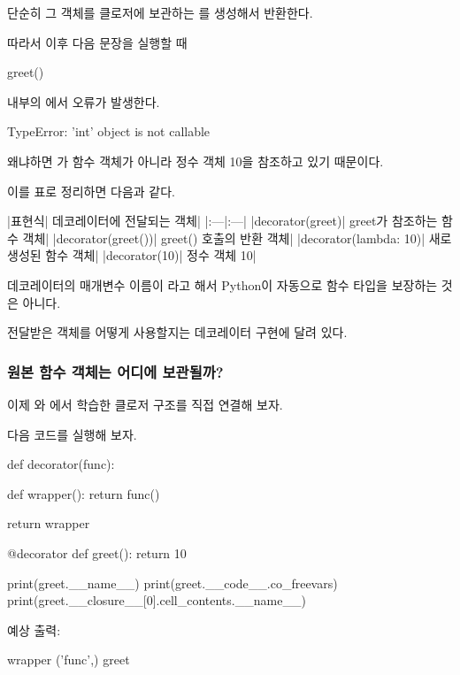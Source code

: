 단순히 그 객체를 클로저에 보관하는 를 생성해서 반환한다.

따라서 이후 다음 문장을 실행할 때

\begin{dhkcode}
greet()
\end{dhkcode}

 내부의 에서 오류가 발생한다.

\begin{dhkzsh}
TypeError: 'int' object is not callable
\end{dhkzsh}

왜냐하면 가 함수 객체가 아니라 정수 객체 10을 참조하고 있기 때문이다.

이를 표로 정리하면 다음과 같다.

\begin{dhktable}
|표현식|	데코레이터에 전달되는 객체|
|:---|:---|
|decorator(greet)|	greet가 참조하는 함수 객체|
|decorator(greet())|	greet() 호출의 반환 객체|
|decorator(lambda: 10)|	새로 생성된 함수 객체|
|decorator(10)|	정수 객체 10|
\end{dhktable}

데코레이터의 매개변수 이름이 라고 해서 Python이 자동으로 함수 타입을 보장하는 것은 아니다.

전달받은 객체를 어떻게 사용할지는 데코레이터 구현에 달려 있다.

\subsubsection{원본 함수 객체는 어디에 보관될까?}

이제 와 에서 학습한 클로저 구조를 직접 연결해 보자.

다음 코드를 실행해 보자.

\begin{dhkcode}
def decorator(func):

    def wrapper():
        return func()

    return wrapper


@decorator
def greet():
    return 10


print(greet.__name__)
print(greet.__code__.co_freevars)
print(greet.__closure__[0].cell_contents.__name__)
\end{dhkcode}

예상 출력:

\begin{dhkzsh}
wrapper
('func',)
greet
\end{dhkzsh}

